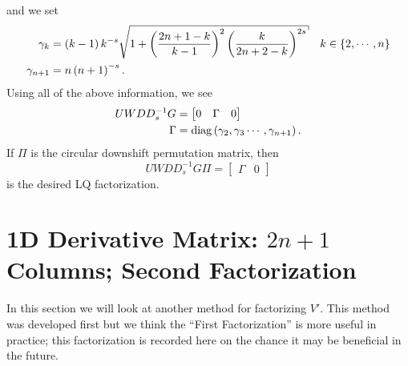 %
and we set
%
\begin{align}
    \gamma_{k} &= \parens{k-1}k^{-s}\sqrt{1 + \parens{\frac{2n+1-k}{k-1}}^{2}
        \parens{\frac{k}{2n+2-k}}^{2s}} \quad k\in\braces{2,\cdots,n}
            \nonumber\\
    \gamma_{n+1} &= n\parens{n+1}^{-s}.
    \label{eq:v1_I_2n_Givens_gamma_def}
\end{align}
%
Using all of the above information, we see
%
\begin{align}
    UWDD_{s}^{-1}G &= \begin{bmatrix} 0 & \Gamma & 0 \end{bmatrix} \nonumber\\
    \Gamma &= \operatorname{diag}\left( \gamma_{2},\gamma_{3}\cdots,\gamma_{n+1} \right).
\end{align}
%
If $\Pi$ is the circular downshift permutation matrix, then
%
\begin{equation}
    UWDD_{s}^{-1}G\Pi = \begin{bmatrix} \Gamma & 0 \end{bmatrix}
\end{equation}
%
is the desired LQ factorization.



\section{1D \CV{} Derivative Matrix: $2n+1$ Columns; Second Factorization}
\label{sec:CV_D_1D_2n_F1}

In this section we will look at another method for factorizing $V'$.
This method was developed first but we think the ``First Factorization''
is more useful in practice;
this factorization is recorded here on the chance
it may be beneficial in the future.


